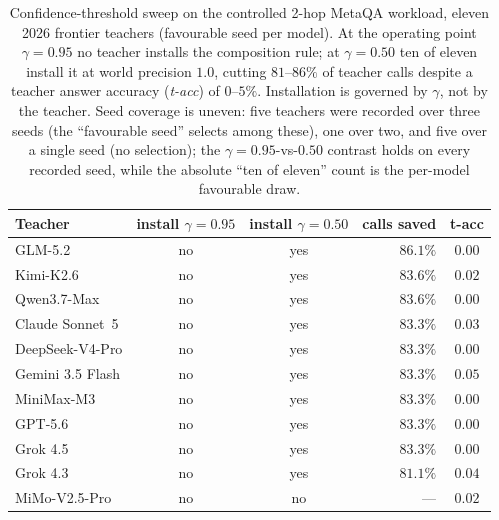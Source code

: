 \begin{table}[t]
\centering
\small
\caption{Confidence-threshold sweep on the controlled 2-hop MetaQA workload,
eleven 2026 frontier teachers (favourable seed per model). At the operating
point $\gamma{=}0.95$ no teacher installs the composition rule; at
$\gamma{=}0.50$ ten of eleven install it at world precision $1.0$, cutting
$81$--$86\%$ of teacher calls despite a teacher answer accuracy (\emph{t-acc}) of
$0$--$5\%$. Installation is governed by $\gamma$, not by the teacher. Seed
coverage is uneven: five teachers were recorded over three seeds (the ``favourable
seed'' selects among these), one over two, and five over a single seed (no
selection); the $\gamma{=}0.95$-vs-$0.50$ contrast holds on every recorded seed,
while the absolute ``ten of eleven'' count is the per-model favourable draw.}
\label{tab:threshold_gate}
\begin{tabular}{lccrc}
\toprule
Teacher & install $\gamma{=}0.95$ & install $\gamma{=}0.50$ & calls saved & t-acc \\
\midrule
GLM-5.2            & no & yes & $86.1\%$ & $0.00$ \\
Kimi-K2.6          & no & yes & $83.6\%$ & $0.02$ \\
Qwen3.7-Max        & no & yes & $83.6\%$ & $0.00$ \\
Claude Sonnet~5    & no & yes & $83.3\%$ & $0.03$ \\
DeepSeek-V4-Pro    & no & yes & $83.3\%$ & $0.00$ \\
Gemini 3.5 Flash   & no & yes & $83.3\%$ & $0.05$ \\
MiniMax-M3         & no & yes & $83.3\%$ & $0.00$ \\
GPT-5.6            & no & yes & $83.3\%$ & $0.00$ \\
Grok 4.5           & no & yes & $83.3\%$ & $0.00$ \\
Grok 4.3           & no & yes & $81.1\%$ & $0.04$ \\
MiMo-V2.5-Pro      & no & no  & ---      & $0.02$ \\
\bottomrule
\end{tabular}
\end{table}
